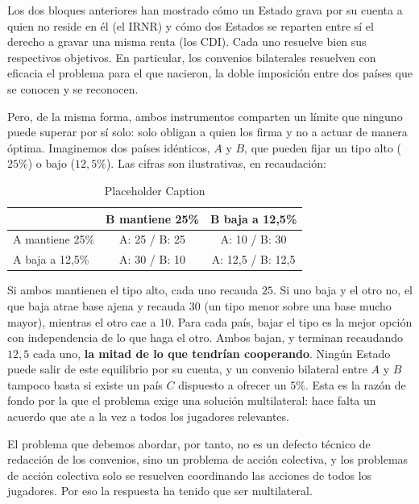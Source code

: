 \documentclass[10pt,a4paper]{article}
\begin{document}
Los dos bloques anteriores han mostrado cómo un Estado grava por su cuenta a quien no reside en él (el IRNR) y cómo dos Estados se reparten entre sí el derecho a gravar una misma renta (los CDI). Cada uno resuelve bien sus respectivos objetivos. En particular, los convenios bilaterales resuelven con eficacia el problema para el que nacieron, la doble imposición entre dos países que se conocen y se reconocen.

Pero, de la misma forma, ambos instrumentos comparten un límite que ninguno puede superar por sí solo: solo obligan a quien los firma y no a actuar de manera óptima. Imaginemos dos países idénticos, $A$ y $B$, que pueden fijar un tipo alto ($25\%$) o bajo ($12,5\%$). Las cifras son ilustrativas, en recaudación:

\begin{table}[h]
    \centering
    \caption{Placeholder Caption}
    \label{tab:placeholder_label}
    \begin{tabular}{lcc}
        \hline
        & B mantiene 25\% & B baja a 12,5\% \\
        \hline
        A mantiene 25\% & A: 25 / B: 25 & A: 10 / B: 30 \\
        A baja a 12,5\% & A: 30 / B: 10 & A: 12,5 / B: 12,5 \\
        \hline
    \end{tabular}
\end{table}

Si ambos mantienen el tipo alto, cada uno recauda $25$. Si uno baja y el otro no, el que baja atrae base ajena y recauda $30$ (un tipo menor sobre una base mucho mayor), mientras el otro cae a $10$. Para cada país, bajar el tipo es la mejor opción con independencia de lo que haga el otro. Ambos bajan, y terminan recaudando $12,5$ cada uno, \textbf{la mitad de lo que tendrían cooperando}. Ningún Estado puede salir de este equilibrio por su cuenta, y un convenio bilateral entre $A$ y $B$ tampoco basta si existe un país $C$ dispuesto a ofrecer un $5\%$. Esta es la razón de fondo por la que el problema exige una solución multilateral: hace falta un acuerdo que ate a la vez a todos los jugadores relevantes.

El problema que debemos abordar, por tanto, no es un defecto técnico de redacción de los convenios, sino un problema de acción colectiva, y los problemas de acción colectiva solo se resuelven coordinando las acciones de todos los jugadores. Por eso la respuesta ha tenido que ser multilateral.
\end{document}
